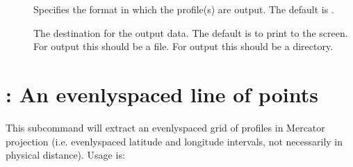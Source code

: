 \documentclass[letterpaper,10pt,english]{sphinxmanual}
\begin{document}
\sphinxAtStartPar
{}
\begin{description}
\item[{}] \leavevmode
\sphinxAtStartPar
Specifies the format in which the profile(s) are output.  The default is .

\item[{}] \leavevmode
\sphinxAtStartPar
The destination for the output data.  The default is to print to the screen.  For  output this should be a file.  For  output this should be a directory.

\item[{}] \leavevmode
\sphinxAtStartPar
{}

\sphinxAtStartPar
{}

\end{description}


\section{: An evenly\sphinxhyphen{}spaced line of points}
\label{\detokenize{userguide:grid-an-evenly-spaced-line-of-points}}
\sphinxAtStartPar
This subcommand will extract an evenly\sphinxhyphen{}spaced grid of profiles in Mercator projection (i.e. evenly\sphinxhyphen{}spaced latitude and longitude intervals, not necessarily in physical distance).  Usage is:
\end{document}
